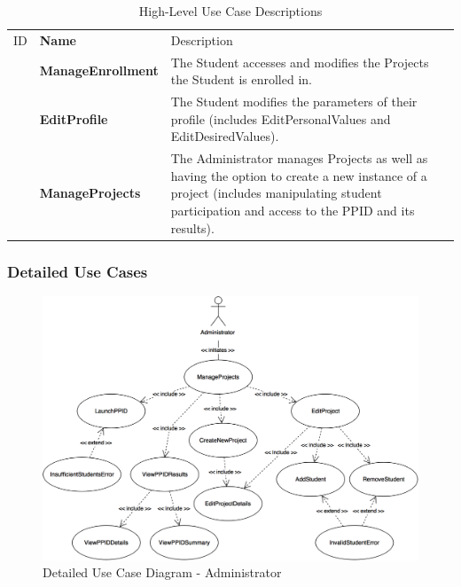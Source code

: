 \documentclass[12pt,letterpaper]{article}
\begin{document}
\begin{table}[H]
	\caption{High-Level Use Case Descriptions}
	\vspace{1em}
	\begin{tabu} to 
	    \tableheader{}ID & Name & Description\\
	    \manageenrollment{} & ManageEnrollment & The Student accesses and modifies the Projects the Student is enrolled in.\\
		\editprofile{} & EditProfile & The Student modifies the parameters of their profile (includes EditPersonalValues and EditDesiredValues).\\
		\manageprojects{} & ManageProjects & The Administrator manages Projects as well as having the option to create a new instance of a project (includes manipulating student participation and access to the PPID and its results).\\
	\end{tabu}
\end{table}

\subsubsection*{Detailed Use Cases}

\begin{figure}[H]
	\centering{}
	\includegraphics[scale=0.26]{imgs/detailed-administrator-use-case-diagram.png}
	\caption{Detailed Use Case Diagram - Administrator}
\end{figure}
\end{document}
